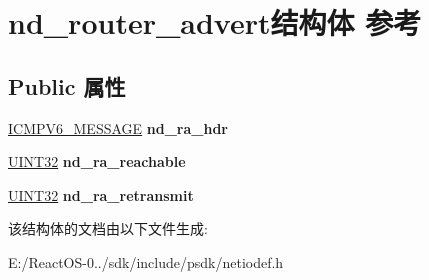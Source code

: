 \hypertarget{structnd__router__advert}{}\section{nd\+\_\+router\+\_\+advert结构体 参考}
\label{structnd__router__advert}
\subsection*{Public 属性}
\begin{DoxyCompactItemize}
\item 
\mbox{\label{structnd__router__advert_a7d54af77ae177586510c4253c3098304}} 
\hyperlink{struct___i_c_m_p___m_e_s_s_a_g_e}{I\+C\+M\+P\+V6\+\_\+\+M\+E\+S\+S\+A\+GE} {\bfseries nd\+\_\+ra\+\_\+hdr}
\item 
\mbox{\label{structnd__router__advert_ae962d7ad94a96f37c725b41e81f854e5}} 
\hyperlink{_processor_bind_8h_ae1e6edbbc26d6fbc71a90190d0266018}{U\+I\+N\+T32} {\bfseries nd\+\_\+ra\+\_\+reachable}
\item 
\mbox{\label{structnd__router__advert_a63ad206388e5fb7dff55460486d4c933}} 
\hyperlink{_processor_bind_8h_ae1e6edbbc26d6fbc71a90190d0266018}{U\+I\+N\+T32} {\bfseries nd\+\_\+ra\+\_\+retransmit}
\end{DoxyCompactItemize}


该结构体的文档由以下文件生成\+:\begin{DoxyCompactItemize}
\item 
E\+:/\+React\+O\+S-\/0../sdk/include/psdk/netiodef.\+h\end{DoxyCompactItemize}
